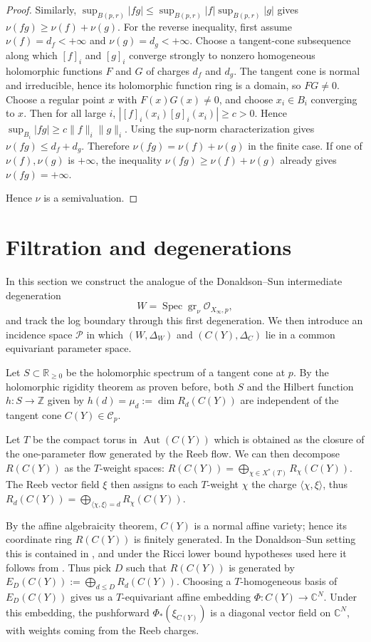 \documentclass[11pt]{amsart}
\theoremstyle{definition}
\theoremstyle{remark}
\begin{document}
\begin{proof}
Similarly, $\sup_{B(p,r)}|fg|\leq \sup_{B(p,r)}|f|\sup_{B(p,r)}|g|$ gives
$\nu(fg)\geq \nu(f)+\nu(g)$. For the reverse inequality, first assume
$\nu(f)=d_f<+\infty$ and $\nu(g)=d_g<+\infty$. Choose a tangent-cone subsequence
along which $[f]_i$ and $[g]_i$ converge strongly to nonzero homogeneous
holomorphic functions $F$ and $G$ of charges $d_f$ and $d_g$. The tangent cone is
normal and irreducible, hence its holomorphic function ring is a domain, so
$FG\neq0$. Choose a regular point $x$ with $F(x)G(x)\neq0$, and choose
$x_i\in B_i$ converging to $x$. Then for all large $i$,
$|[f]_i(x_i)[g]_i(x_i)|\geq c>0$. Hence
$\sup_{B_i}|fg|\geq c\|f\|_i\|g\|_i$. Using the sup-norm characterization gives
$\nu(fg)\leq d_f+d_g$. Therefore $\nu(fg)=\nu(f)+\nu(g)$ in the finite case.
If one of $\nu(f),\nu(g)$ is $+\infty$, the inequality
$\nu(fg)\geq\nu(f)+\nu(g)$ already gives $\nu(fg)=+\infty$.

Hence $\nu$ is a semivaluation.
\end{proof}



\section{Filtration and degenerations}

In this section we construct the analogue of the Donaldson--Sun intermediate degeneration
\cite[Section~3]{DSII}
\[
W=\operatorname{Spec}\operatorname{gr}_\nu\mathcal O_{X_\infty,p},
\]
and track the log boundary through this first degeneration. We then introduce
an incidence space $\mathcal P$ in which $(W,\Delta_W)$ and
$(C(Y),\Delta_C)$ lie in a common equivariant parameter space.

Let $S \subset \mathbb R_{\geq 0}$ be the holomorphic spectrum of a tangent cone
at $p$. By the holomorphic rigidity theorem as proven before, both $S$ and the
Hilbert function $h:S\rightarrow\mathbb Z$ given by
$h(d)=\mu_d:=\dim R_d(C(Y))$ are independent of the tangent cone
$C(Y)\in\mathcal C_p$.

Let $T$ be the compact torus in $\operatorname{Aut}(C(Y))$ which is obtained as
the closure of the one-parameter flow generated by the Reeb flow. We can then
decompose $R(C(Y))$ as the $T$-weight spaces:
$R(C(Y))=\bigoplus_{\chi\in X^*(T)}R_\chi(C(Y))$. The Reeb vector field $\xi$
then assigns to each $T$-weight $\chi$ the charge $\langle \chi,\xi\rangle$,
thus $R_d(C(Y))=\bigoplus_{\langle\chi,\xi\rangle=d}R_\chi(C(Y))$.

By the affine algebraicity theorem, $C(Y)$ is a normal affine variety; hence its
coordinate ring $R(C(Y))$ is finitely generated. In the Donaldson--Sun setting
this is contained in \cite[Theorem~1.2]{DSII}, and under the Ricci lower bound
hypotheses used here it follows from \cite[Theorem~1.1]{SLII}. Thus pick $D$ such that
$R(C(Y))$ is generated by $E_D(C(Y)):=\bigoplus_{d\leq D}R_d(C(Y))$. Choosing
a $T$-homogeneous basis of $E_D(C(Y))$ gives us a $T$-equivariant affine embedding
$\Phi:C(Y)\rightarrow\mathbb C^N$. Under this embedding, the pushforward
$\Phi_*(\xi_{C(Y)})$ is a diagonal vector field on $\mathbb C^N$, with weights
coming from the Reeb charges.
\end{document}
